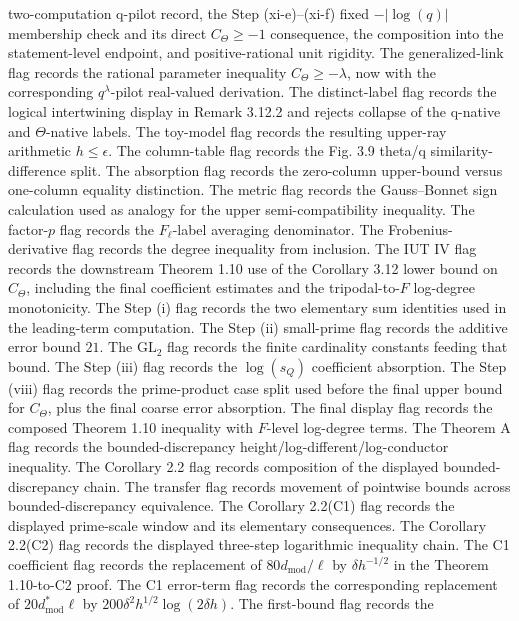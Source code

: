 \documentclass[11pt]{article}
\begin{document}
two-computation q-pilot record, the Step (xi-e)--(xi-f) fixed
\(-|\log(q)|\) membership check and its direct \(C_\Theta\ge-1\) consequence,
the composition into the statement-level endpoint, and positive-rational unit
rigidity.
The generalized-link flag records the rational parameter inequality
\(C_\Theta\ge-\lambda\), now with the corresponding \(q^\lambda\)-pilot
real-valued derivation.
The distinct-label flag records the logical intertwining display in
Remark 3.12.2 and rejects collapse of the q-native and \(\Theta\)-native labels.
The toy-model flag records the resulting upper-ray arithmetic \(h\le\epsilon\).
The column-table flag records the Fig. 3.9 theta/q similarity-difference split.
The absorption flag records the zero-column upper-bound versus one-column
equality distinction.
The metric flag records the Gauss--Bonnet sign calculation used as analogy for
the upper semi-compatibility inequality.
The factor-\(p\) flag records the \(F_\ell\)-label averaging denominator.
The Frobenius-derivative flag records the degree inequality from inclusion.
The IUT IV flag records the downstream Theorem 1.10 use of the Corollary 3.12
lower bound on \(C_\Theta\), including the final coefficient estimates and the
tripodal-to-\(F\) log-degree monotonicity.  The Step (i) flag records the two
elementary sum identities used in the leading-term computation.  The Step (ii)
small-prime flag records the additive error bound \(21\).  The \(\mathrm{GL}_2\)
flag records the finite cardinality constants feeding that bound.  The
Step (iii) flag records the \(\log(s_Q)\) coefficient absorption.
The Step (viii) flag records the prime-product case split used before the final
upper bound for \(C_\Theta\), plus the final coarse error absorption.  The final
display flag records the composed Theorem 1.10 inequality with \(F\)-level
log-degree terms.  The Theorem A flag records the bounded-discrepancy
height/log-different/log-conductor inequality.  The Corollary 2.2 flag records
composition of the displayed bounded-discrepancy chain.  The transfer flag
records movement of pointwise bounds across bounded-discrepancy equivalence.
The Corollary 2.2(C1) flag records the displayed prime-scale window and its
elementary consequences.  The Corollary 2.2(C2) flag records the displayed
three-step logarithmic inequality chain.  The C1 coefficient flag records the
replacement of \(80d_{\mathrm{mod}}/\ell\) by \(\delta h^{-1/2}\) in the
Theorem 1.10-to-C2 proof.  The C1 error-term flag records the corresponding
replacement of \(20d^*_{\mathrm{mod}}\ell\) by
\(200\delta^2h^{1/2}\log(2\delta h)\).  The first-bound flag records the
\end{document}
